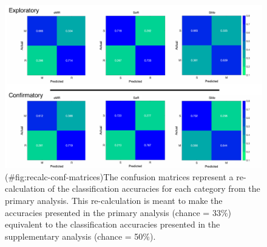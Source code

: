 \begin{appendix}
\begin{figure}
\centering
\includegraphics{supplementary_analysis/recalc_orig_accs/confusion_matrices/recalc_conf_matrices.pdf}
\caption{(\#fig:recalc-conf-matrices)The confusion matrices represent a
re-calculation of the classification accuracies for each category from
the primary analysis. This re-calculation is meant to make the
accuracies presented in the primary analysis (chance = 33\%) equivalent
to the classification accuracies presented in the supplementary analysis
(chance = 50\%).}
\end{figure}
\end{appendix}
